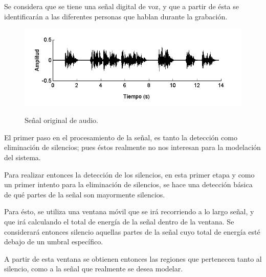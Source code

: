 Se considera que se tiene una señal digital de voz, y que a partir de ésta se identificarán a las diferentes personas que hablan durante la grabación.

\begin{figure}[ht]
  {\includegraphics[width=0.9\linewidth]{gfx/chap2/signal-orig}} \quad
  \caption{Señal original de audio.}
  \label{fig:sign_orig}
\end{figure}

El primer paso en el procesamiento de la señal, es tanto la detección como eliminación de silencios; pues éstos realmente no nos interesan para la modelación del sistema.


Para realizar entonces la detección de los silencios, en esta primer etapa y como un primer intento para la eliminación de silencios, se hace una detección básica de qué partes de la señal son mayormente silencios.

Para ésto, se utiliza una ventana móvil que se irá recorriendo a lo largo señal, y que irá calculando el total de energía de la señal dentro de la ventana. Se considerará entonces silencio aquellas partes de la señal cuyo total de energía esté debajo de un umbral específico.

A partir de esta ventana se obtienen entonces las regiones que pertenecen tanto al silencio, como a la señal que realmente se desea modelar.

